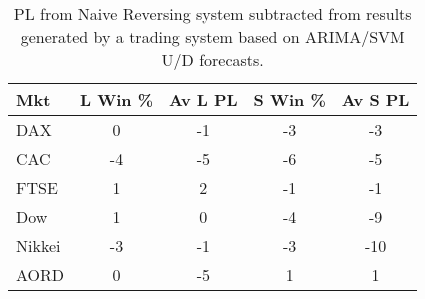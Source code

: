 \begin{table}[ht]
\centering
\caption[ARIMA/SVM U/D system results minus Naive Reversing results]{PL from Naive Reversing system subtracted from results generated by a trading system based on ARIMA/SVM U/D forecasts.} 
\label{tab:chp_ts:pUD_CAT_arima_svm_sys_ch6}
\begin{tabular}{lcccc}
  \toprule Mkt & L Win \% & Av L PL & S Win \% & Av S PL \\ 
  \midrule DAX & 0 & -1 & -3 & -3 \\ 
  CAC & -4 & -5 & -6 & -5 \\ 
  FTSE & 1 & 2 & -1 & -1 \\ 
  Dow & 1 & 0 & -4 & -9 \\ 
  Nikkei & -3 & -1 & -3 & -10 \\ 
  AORD & 0 & -5 & 1 & 1 \\ 
   \bottomrule \end{tabular}
\end{table}
